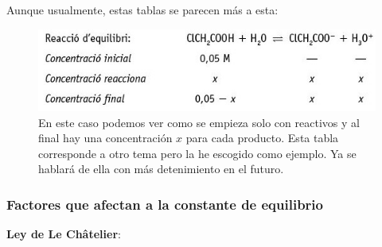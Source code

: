 \documentclass[arial,a4paper,print]{article}
\begin{document}
Aunque usualmente, estas tablas se parecen más a esta:
\begin{figure}[H]
	\centering
	\includegraphics[width=0.7\linewidth]{figures/tabla2_Kc}
	\caption{En este caso podemos ver como se empieza solo con reactivos y al final hay una concentración $x$ para cada producto. Esta tabla corresponde a otro tema pero la he escogido como ejemplo. Ya se hablará de ella con más detenimiento en el futuro. }
	\label{fig:tabla2kc}
\end{figure}

\subsubsection{Factores que afectan a la constante de equilibrio}

\textbf{Ley de Le Châtelier}: \\
\end{document}
